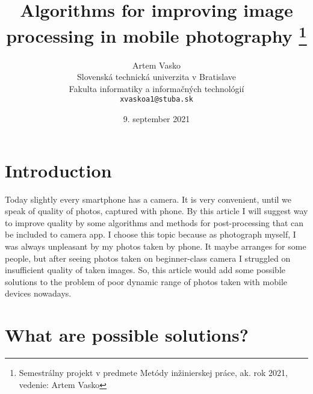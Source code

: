 \documentclass[10pt,twoside,english,a4paper]{article}
\title{Algorithms for improving image processing in mobile photography \thanks{Semestrálny projekt v predmete Metódy inžinierskej práce, ak. rok 2021, vedenie: Artem Vasko}} %
\author{Artem Vasko\\[2pt]
	{\small Slovenská technická univerzita v Bratislave}\\
	{\small Fakulta informatiky a informačných technológií}\\
	{\small \texttt{xvaskoa1@stuba.sk}}
	}
\date{\small 9. september 2021} %
\begin{document}
\maketitle





\section{Introduction}

Today slightly every smartphone has a camera. It is very convenient,
until we speak of quality of photos, captured with phone.
By this article I will suggest way to improve quality by some algorithms and
methods for post-processing that can be included to camera
app. I choose this topic because as photograph myself, I was always
unpleasant by my photos taken by phone. It maybe arranges for some people,
but after seeing photos taken on beginner-class camera I struggled on
insufficient quality of taken images. So, this article would add some
possible solutions to the problem of poor dynamic range of photos
taken with mobile devices nowadays.



\section{What are possible solutions?} \label{nejaka}
\end{document}
